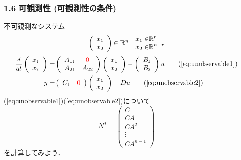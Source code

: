 \begin{frame}[t]
\frametitle{1.6 可観測性 (可観測性の条件)}
不可観測なシステム
\begin{align}
  \begin{array}{cc}
    \left(
      \begin{array}{c}
         x_1 \\  x_2
      \end{array}
    \right)\in \mathbb{R}^{n} &
    \begin{aligned}
       x_1 \in& \mathbb{R}^r \\
       x_2 \in& \mathbb{R}^{n-r} \\
    \end{aligned}
  \end{array} \notag
\end{align}
\begin{align}
  \frac{d}{dt}
  \left(
    \begin{array}{c}
      x_1 \\ x_2
    \end{array}
  \right) =& \left(
    \begin{array}{cc}
      A_{11} & \textcolor{red}{0} \\ A_{21} & A_{22}
    \end{array}
  \right)
  \left(
    \begin{array}{c}
      x_1 \\ x_2
    \end{array}
  \right) +
  \left(
    \begin{array}{c}
      B_1 \\ B_2
    \end{array}
  \right) u \tag{\ref{eq:unobservable1}}\\
  y =& \left(
    \begin{array}{cc}
      C_1 & \textcolor{red}{0}
    \end{array}
  \right)
  \left(
    \begin{array}{c}
      x_1 \\ x_2
    \end{array}
  \right) + D u \tag{\ref{eq:unobservable2}}
\end{align}
(\ref{eq:unobservable1})(\ref{eq:unobservable2})について
\begin{equation}
 N^T =
  \left(\begin{array}{c}
         C        \\
   C A      \\
   C A^2    \\
   \vdots   \\
   C A^{n-1}
  \end{array}\right)
\end{equation}
を計算してみよう．
\end{frame}


